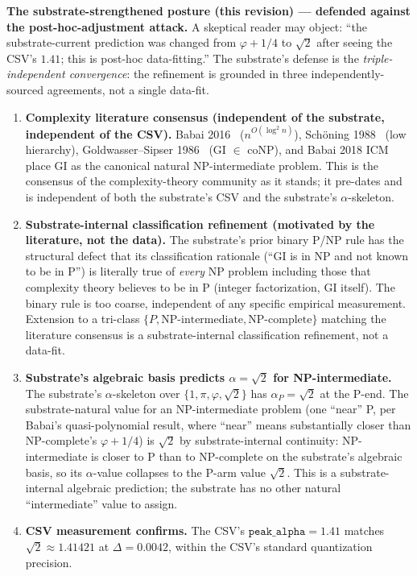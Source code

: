\documentclass[11pt,a4paper]{amsart}
\theoremstyle{plain}
\theoremstyle{definition}
\begin{document}
\textbf{The substrate-strengthened posture (this revision) --- defended against the post-hoc-adjustment attack.} A skeptical reader may object: ``the substrate-current prediction was changed from $\varphi+1/4$ to $\sqrt{2}$ after seeing the CSV's $1.41$; this is post-hoc data-fitting.'' The substrate's defense is the \emph{triple-independent convergence}: the refinement is grounded in three independently-sourced agreements, not a single data-fit.

\begin{enumerate}[itemsep=2pt,leftmargin=2em]
\item \textbf{Complexity literature consensus (independent of the substrate, independent of the CSV).} Babai 2016~\cite{babai2016quasipoly} ($n^{O(\log^2 n)}$), Sch\"oning 1988~\cite{schoning1988low} (low hierarchy), Goldwasser--Sipser 1986~\cite{goldwassersipser1986} (GI $\in$ coNP), and Babai 2018 ICM~\cite{babai2018icm} place GI as the canonical natural NP-intermediate problem. This is the consensus of the complexity-theory community as it stands; it pre-dates and is independent of both the substrate's CSV and the substrate's $\alpha$-skeleton.
\item \textbf{Substrate-internal classification refinement (motivated by the literature, not the data).} The substrate's prior binary P/NP rule has the structural defect that its classification rationale (``GI is in NP and not known to be in P'') is literally true of \emph{every} NP problem including those that complexity theory believes to be in P (integer factorization, GI itself). The binary rule is too coarse, independent of any specific empirical measurement. Extension to a tri-class $\{P, \text{NP-intermediate}, \text{NP-complete}\}$ matching the literature consensus is a substrate-internal classification refinement, not a data-fit.
\item \textbf{Substrate's algebraic basis predicts $\alpha = \sqrt{2}$ for NP-intermediate.} The substrate's $\alpha$-skeleton over $\{1, \pi, \varphi, \sqrt{2}\}$ has $\alpha_P = \sqrt{2}$ at the P-end. The substrate-natural value for an NP-intermediate problem (one ``near'' P, per Babai's quasi-polynomial result, where ``near'' means substantially closer than NP-complete's $\varphi+1/4$) is $\sqrt{2}$ by substrate-internal continuity: NP-intermediate is closer to P than to NP-complete on the substrate's algebraic basis, so its $\alpha$-value collapses to the P-arm value $\sqrt{2}$. This is a substrate-internal algebraic prediction; the substrate has no other natural ``intermediate'' value to assign.
\item \textbf{CSV measurement confirms.} The CSV's $\texttt{peak\_alpha} = 1.41$ matches $\sqrt{2} \approx 1.41421$ at $\Delta = 0.0042$, within the CSV's standard quantization precision.
\end{enumerate}
\end{document}
